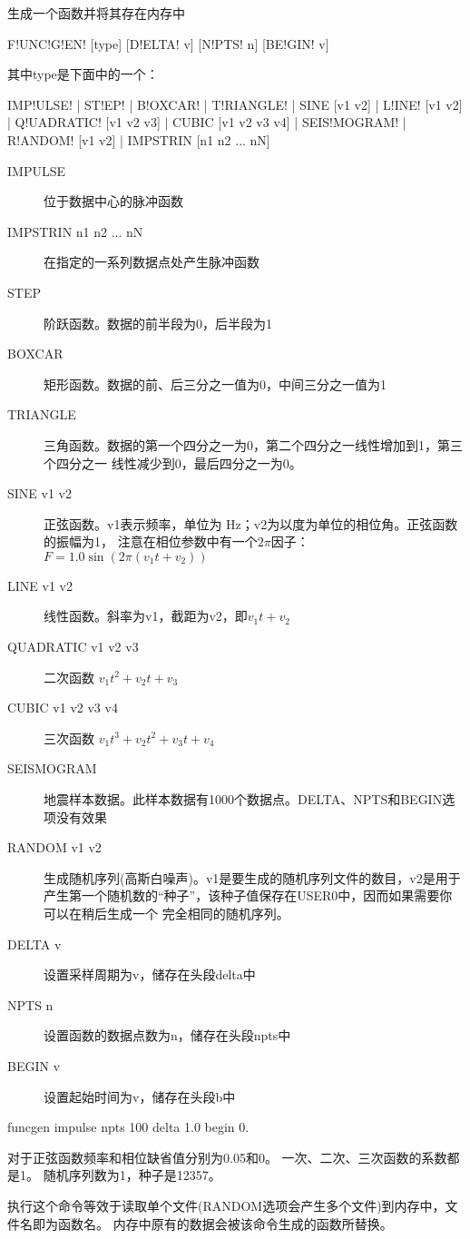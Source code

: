 \label{cmd:funcgen}

生成一个函数并将其存在内存中

\begin{SACSTX}
F!UNC!G!EN! [type] [D!ELTA! v] [N!PTS! n] [BE!GIN! v]
\end{SACSTX}
其中type是下面中的一个：
\begin{SACSTX}
IMP!ULSE! | ST!EP! | B!OXCAR! | T!RIANGLE! | SINE [v1 v2] | L!INE! [v1 v2] |
Q!UADRATIC! [v1 v2 v3] | CUBIC [v1 v2 v3 v4] | SEIS!MOGRAM! |
R!ANDOM! [v1 v2] | IMPSTRIN  [n1 n2 ... nN]
\end{SACSTX}

\begin{description}
\item [IMPULSE] 位于数据中心的脉冲函数
\item [IMPSTRIN n1 n2 ... nN] 在指定的一系列数据点处产生脉冲函数
\item [STEP] 阶跃函数。数据的前半段为0，后半段为1
\item [BOXCAR] 矩形函数。数据的前、后三分之一值为0，中间三分之一值为1
\item [TRIANGLE] 三角函数。数据的第一个四分之一为0，第二个四分之一线性增加到1，第三个四分之一
    线性减少到0，最后四分之一为0。
\item [SINE v1 v2] 正弦函数。v1表示频率，单位为 \si{\Hz}；v2为以度为单位的相位角。正弦函数的振幅为1，
    注意在相位参数中有一个$2\pi$因子：$F = 1.0 \sin (2\pi (v_1t+v_2))$
\item [LINE v1 v2] 线性函数。斜率为v1，截距为v2，即$ v_1 t + v_2 $
\item [QUADRATIC v1 v2 v3] 二次函数 $v_1 t^{2} + v_2 t + v_3 $
\item [CUBIC v1 v2 v3 v4] 三次函数 $ v_1 t^{3} + v_2 t^2 + v_3t + v_4 $
\item [SEISMOGRAM] 地震样本数据。此样本数据有1000个数据点。DELTA、NPTS和BEGIN选项没有效果
\item [RANDOM v1 v2] 生成随机序列(高斯白噪声)。v1是要生成的随机序列文件的数目，v2是用于
    产生第一个随机数的``种子''，该种子值保存在USER0中，因而如果需要你可以在稍后生成一个
    完全相同的随机序列。
\item [DELTA v] 设置采样周期为v，储存在头段delta中
\item [NPTS n] 设置函数的数据点数为n，储存在头段npts中
\item [BEGIN v] 设置起始时间为v，储存在头段b中
\end{description}

\begin{SACDFT}
funcgen impulse npts 100 delta 1.0 begin 0.
\end{SACDFT}
对于正弦函数频率和相位缺省值分别为0.05和0。
一次、二次、三次函数的系数都是1。
随机序列数为1，种子是12357。

执行这个命令等效于读取单个文件(RANDOM选项会产生多个文件)到内存中，文件名即为函数名。
内存中原有的数据会被该命令生成的函数所替换。
